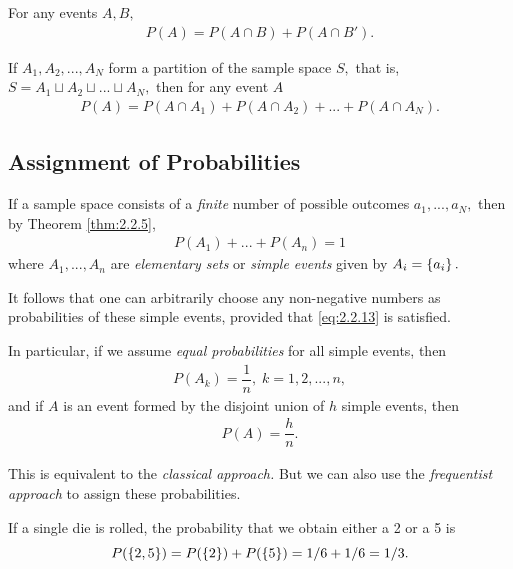 \begin{theorem}
	\label{thm:2.2.7}
	For any events $A,B,$
	\begin{align}
		\label{eq:2.2.11}
		P(A)=P(A\cap B)+P(A\cap B').
	\end{align}
\end{theorem}



\begin{theorem}
	\label{thm:2.2.8}
	If $A_{1},A_{2},..., A_{N}$ form a partition of the sample space $S,$ that is,
	$S=A_{1} \sqcup A_{2} \sqcup ... \sqcup A_{N},$ then for any event $A$
	\begin{align}
		\label{eq:2.2.12}
		P(A)=P(A\cap A_{1})+ P(A\cap A_{2}) + ... +P(A\cap A_{N}).
	\end{align}
\end{theorem}


\subsection{Assignment of Probabilities}

If a sample space consists of a \emph{finite} number of possible outcomes $a_{1},...,a_{N},$ then by Theorem \ref{thm:2.2.5},
\begin{align}
	\label{eq:2.2.13}
	P(A_{1})+...+P(A_{n})=1
\end{align}
where $A_{1},...,A_{n}$ are \emph{elementary sets} or \emph{simple events} given by $A_{i}=\left\{ a_{i} \right\}.$


It follows that one can arbitrarily choose any non-negative numbers as probabilities of these simple events, provided that \eqref{eq:2.2.13} is satisfied.

In particular, if we assume \emph{equal probabilities} for all simple events, then
\begin{align}
	\label{eq:2.2.14}
	P(A_{k})=\dfrac{1}{n}, \; k=1,2,...,n,
\end{align}
and if $A$ is an event formed by the disjoint union of $h$ simple events, then
\begin{align}
	\label{eq:2.2.15}
	P(A)=\dfrac{h}{n}.
\end{align}


\begin{remark}
	This is equivalent to the \textit{classical approach.} But we can also use the \textit{frequentist approach} to assign these probabilities.
\end{remark}


\begin{example}
	\label{exmp:2.2.12}
	If a single die is rolled, the probability that we obtain either a 2 or a 5 is 
	\[ P(\left\{ 2,5 \right\}) = P(\left\{ 2 \right\}) + P(\{5\}) = 1/6 + 1/6 = 1/3. \]
\end{example}
